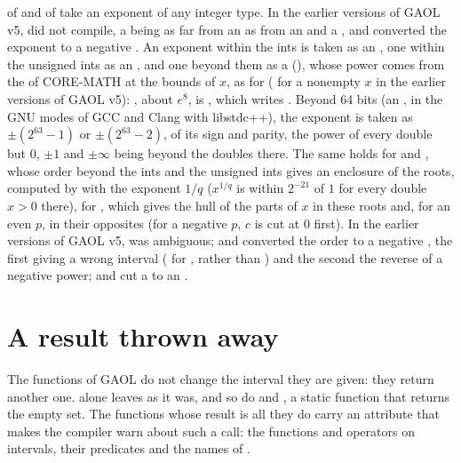 \medskip
{} of  and  of 
take an exponent of any integer type. In the earlier versions of GAOL v5,  did not compile, a
 being as far from an  as from an  and a
, and  converted the exponent to a
negative . An exponent within the ints is taken as an ,
one within the unsigned ints as an , and one beyond them as a
 (), whose power comes from the
 of CORE-MATH at the bounds of $x$, as for 
(\itv{-\infty}{+\infty} for a nonempty $x$ in the earlier versions of GAOL v5):
, about $e^8$, is
, which
 writes .
Beyond 64 bits (an
, in the GNU modes of GCC and Clang with libstdc++), the exponent is taken as $\pm(2^{63}-1)$ or
$\pm(2^{63}-2)$, of its sign and parity, the power of every double but $0$,
$\pm 1$ and $\pm\infty$ being beyond the doubles there. The same holds for
 and , whose order beyond the ints and
the unsigned ints gives an enclosure of the roots, computed by  with
the exponent $1/q$ ($x^{1/q}$ is within $2^{-21}$ of $1$ for every double
$x>0$ there), for , which gives the hull of the parts
of $x$ in these roots and, for an even $p$, in their opposites (for a negative
$p$, $c$ is cut at 0 first). In the earlier versions of GAOL v5,
 was ambiguous;  and 
converted the order to a negative , the first giving a wrong
interval ( for , rather than
) and the second the reverse of a negative
power; and  cut a  to an .

\section{A result thrown away}\label{sec:nodiscard}
%

The functions of GAOL do not change the interval they are given: they return
another one.  alone leaves  as it was, and so do
 and , a static function that returns the
empty set. The functions whose result is all they do carry an attribute that
makes the compiler warn about such a call:\newinvfive{} the functions and
operators on intervals, their predicates and the names of .

